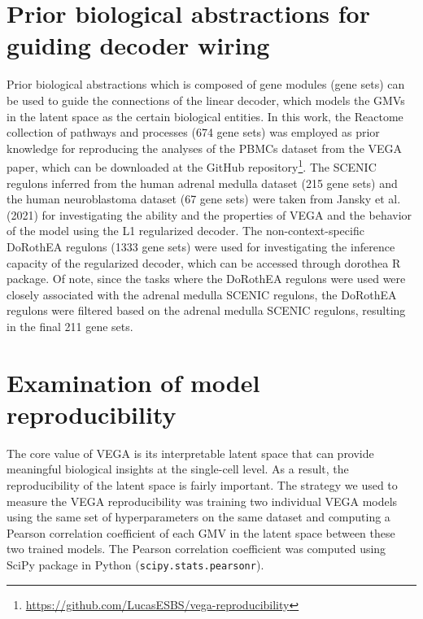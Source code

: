 \section{Prior biological abstractions for guiding decoder wiring}\label{methods:prior}
Prior biological abstractions which is composed of gene modules (gene sets) can be used to guide the connections of the linear decoder, which models the GMVs in the latent space as the certain biological entities\cite{Seninge2021}. In this work, the Reactome collection of pathways and processes\cite{Jassal2020} (674 gene sets) was employed as prior knowledge for reproducing the analyses of the PBMCs dataset\cite{Kang2018} from the VEGA paper\cite{Seninge2021}, which can be downloaded at the GitHub repository\footnote{\url{https://github.com/LucasESBS/vega-reproducibility}}. The SCENIC\cite{Aibar2017} regulons inferred from the human adrenal medulla dataset (215 gene sets) and the human neuroblastoma dataset (67 gene sets) were taken from Jansky et al. (2021) for investigating the ability and the properties of VEGA and the behavior of the model using the L1 regularized decoder. The non-context-specific DoRothEA\cite{Garcia-Alonso2019} regulons (1333 gene sets) were used for investigating the inference capacity of the regularized decoder, which can be accessed through dorothea R package. Of note, since the tasks where the DoRothEA regulons were used were closely associated with the adrenal medulla SCENIC regulons, the DoRothEA regulons were filtered based on the adrenal medulla SCENIC regulons, resulting in the final 211 gene sets.

\section{Examination of model reproducibility}\label{methods:stability}
The core value of VEGA\cite{Seninge2021} is its interpretable latent space that can provide meaningful biological insights at the single-cell level. As a result, the reproducibility of the latent space is fairly important. The strategy we used to measure the VEGA reproducibility was training two individual VEGA models using the same set of hyperparameters on the same dataset and computing a Pearson correlation coefficient of each GMV in the latent space between these two trained models. The Pearson correlation coefficient was computed using SciPy package\cite{Virtanen2020} in Python (\texttt{scipy.stats.pearsonr}).

